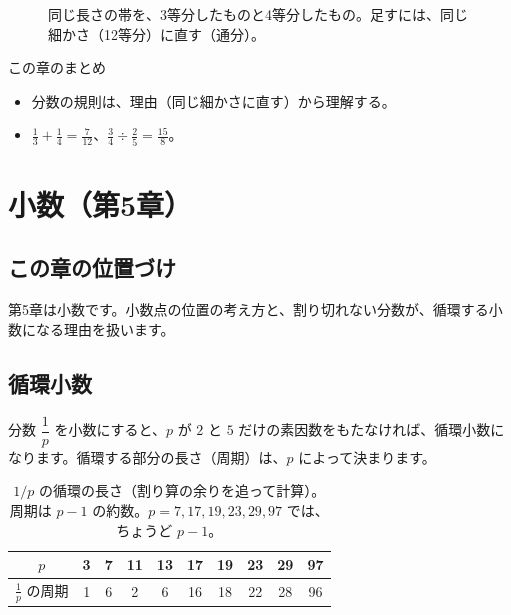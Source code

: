 \documentclass[a4paper,11pt,openany]{ltjsbook}
\begin{document}
\begin{figure}[htbp]
\centering
{}
\caption{同じ長さの帯を、3等分したものと4等分したもの。足すには、同じ細かさ（12等分）に直す（通分）。}
\end{figure}

\begin{pointbox}{この章のまとめ}
\begin{itemize}[leftmargin=*]
\item 分数の規則は、理由（同じ細かさに直す）から理解する。
\item $\tfrac13+\tfrac14=\tfrac7{12}$、$\tfrac34\div\tfrac25=\tfrac{15}8$。
\end{itemize}
\end{pointbox}

\chapter{小数（第5章）}

\section{この章の位置づけ}

第5章は小数です。小数点の位置の考え方と、割り切れない分数が、循環する小数になる理由を扱います。

\section{循環小数}

分数 $\dfrac1p$ を小数にすると、$p$ が $2$ と $5$ だけの素因数をもたなければ、循環小数になります。循環する部分の長さ（周期）は、$p$ によって決まります。

\begin{table}[htbp]
\centering
\begin{tabular}{c|ccccccccc}
\toprule
$p$ & 3 & 7 & 11 & 13 & 17 & 19 & 23 & 29 & 97\\
\midrule
$\tfrac1p$ の周期 & 1 & 6 & 2 & 6 & 16 & 18 & 22 & 28 & 96\\
\bottomrule
\end{tabular}
\caption{$1/p$ の循環の長さ（割り算の余りを追って計算）。周期は $p-1$ の約数。$p=7,17,19,23,29,97$ では、ちょうど $p-1$。}
\end{table}
\end{document}
